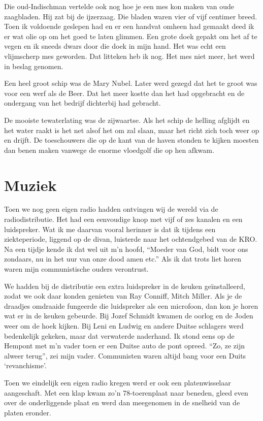 \documentclass[12pt,twoside, openright]{memoir}
\begin{document}
Die oud-Indischman vertelde ook nog hoe je een mes kon maken van oude zaagbladen. Hij zat bij de ijzerzaag. Die bladen waren vier of vijf centimer breed. Toen ik voldoende geslepen had en er een handvat omheen had gemaakt deed ik er wat olie op om het goed te laten glimmen. Een grote doek gepakt om het af te vegen en ik sneeds dwars door die doek in mijn hand. Het was echt een vlijmscherp mes geworden. Dat litteken heb ik nog. Het mes niet meer, het werd in beslag genomen.

Een heel groot schip was de Mary Nubel. Later werd gezegd dat het te groot was voor een werf als de Beer. Dat het meer kostte dan het had opgebracht en de ondergang van het bedrijf dichterbij had gebracht. 

De mooiste tewaterlating was de zijwaartse. Als het schip de helling afglijdt en het water raakt is het net alsof het om zal slaan, maar het richt zich toch weer op en drijft. De toeschouwers die op de kant van de haven stonden te kijken moesten dan benen maken vanwege de enorme vloedgolf die op hen afkwam.

\section*{Muziek} %
\label{cha:muziek}

Toen we nog geen eigen radio hadden ontvingen wij de wereld via de radiodistributie. Het had een eenvoudige knop met vijf of zes kanalen en een luidspreker. Wat ik me daarvan vooral herinner is dat ik tijdens een ziekteperiode, liggend op de divan, luisterde naar het ochtendgebed van de KRO. Na een tijdje kende ik dat wel uit m’n hoofd, ``Moeder van God, bidt voor ons zondaars, nu in het uur van onze dood amen etc.'' Als ik dat trots liet horen waren mijn communistische ouders verontrust. 

We hadden bij de distributie een extra luidspreker in de keuken geïnstalleerd, zodat we ook daar konden genieten van Ray Conniff, Mitch Miller. Als je de draadjes omdraaide fungeerde die luidspreker als een microfoon, dan kon je horen wat er in de keuken gebeurde. Bij Jozef Schmidt kwamen de oorlog en de Joden weer om de hoek kijken. Bij Leni en Ludwig en andere Duitse schlagers werd bedenkelijk gekeken, maar dat verwaterde naderhand. Ik stond eens op de Hempont met m’n vader toen er een Duitse auto de pont opreed. ``Zo, ze zijn alweer terug'', zei mijn vader. Communisten waren altijd bang voor een Duits `revanchisme’.

Toen we eindelijk een eigen radio kregen werd er ook een platenwisselaar aangeschaft. Met een klap kwam zo’n 78-toerenplaat naar beneden, gleed even over de onderliggende plaat en werd dan meegenomen in de snelheid van de platen eronder.  
\end{document}
